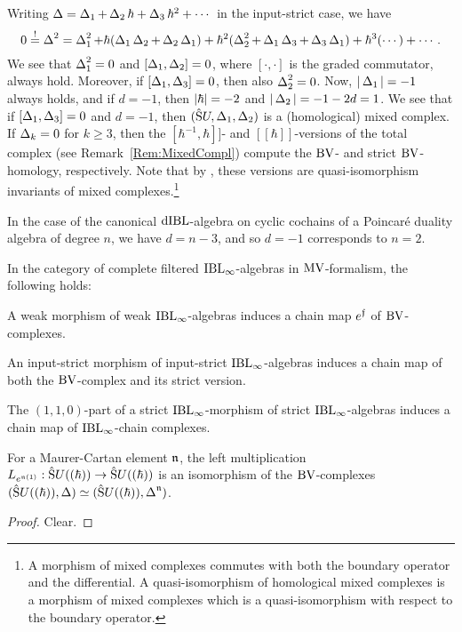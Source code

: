 \documentclass[\MainFolder/Text.tex]{subfiles}
\begin{document}
\begin{Remark}\label{Rem:BVBicomp}
Writing $\operatorname{\Delta} = \operatorname{\Delta}_1 + \operatorname{\Delta}_2 \hbar + \operatorname{\Delta}_3 \hbar^2 + \dotsb$ in the input-strict case, we have 
\[ 0 \overset{!}{=} \operatorname{\Delta}^2 = \operatorname{\Delta}_1^2 + \hbar(\operatorname{\Delta}_1 \operatorname{\Delta}_2 + \operatorname{\Delta}_2 \operatorname{\Delta}_1) + \hbar^2(\operatorname{\Delta}_2^2 + \operatorname{\Delta}_1 \operatorname{\Delta}_3 + \operatorname{\Delta}_3 \operatorname{\Delta}_1) + \hbar^3(\dotsb) + \dotsb. \]
We see that $\operatorname{\Delta}_1^2 = 0$ and $[\operatorname{\Delta}_1,\operatorname{\Delta}_2] = 0$, where $[\cdot,\cdot]$ is the graded commutator, always hold. Moreover, if $[\operatorname{\Delta}_1,\operatorname{\Delta}_3] = 0$, then also $\operatorname{\Delta}_2^2 = 0$. Now, $|\operatorname{\Delta}_1| = -1$ always holds, and if $d=-1$, then $|\hbar| = -2$ and $|\operatorname{\Delta}_2| = -1 - 2d = 1$. We see that if $[\operatorname{\Delta}_1,\operatorname{\Delta}_3]=0$ and $d=-1$, then $(\hat{\mathrm{S}}U, \operatorname{\Delta}_1, \operatorname{\Delta}_2)$ is a (homological) mixed complex. If $\operatorname{\Delta}_k = 0$ for $k \ge 3$, then the $[\hbar^{-1},\hbar]]$- and $[[\hbar]]$-versions of the total complex (see Remark~\ref{Rem:MixedCompl}) compute the $\mathrm{BV}$- and strict $\mathrm{BV}$-homology, respectively. Note that by \cite[Proposition~2.2]{Cieliebak2018b}, these versions are quasi-isomorphism invariants of mixed complexes.\footnote{A morphism of mixed complexes commutes with both the boundary operator and the differential. A quasi-isomorphism of homological mixed complexes is a morphism of mixed complexes which is a quasi-isomorphism with respect to the boundary operator.}

In the case of the canonical $\mathrm{dIBL}$-algebra on cyclic cochains of a Poincar\'e duality algebra of degree $n$, we have $d=n-3$, and so $d=-1$ corresponds to $n=2$.
\end{Remark}
\begin{Proposition}\label{Prop:ObservationsMor}
In the category of complete filtered $\mathrm{IBL}_\infty$-algebras in $\mathrm{MV}$-formalism, the following holds:
\begin{ClaimList}
 \item A weak morphism of weak $\mathrm{IBL}_\infty$-algebras induces a chain map $e^{\mathfrak{f}}$ of $\mathrm{BV}$-complexes.
 \item An input-strict morphism of input-strict $\mathrm{IBL}_\infty$-algebras induces a chain map of both the $\mathrm{BV}$-complex and its strict version. 
 \item The $(1,1,0)$-part of a strict $\mathrm{IBL}_\infty$-morphism of strict $\mathrm{IBL}_\infty$-algebras induces a chain map of $\mathrm{IBL}_\infty$-chain complexes.
 \item For a Maurer-Cartan element $\mathfrak{n}$, the left multiplication $L_{e^{\mathfrak{n}(1)}}: \hat{\mathrm{S}}U((\hbar))\rightarrow \hat{\mathrm{S}}U((\hbar))$ is an isomorphism of the $\mathrm{BV}$-complexes $(\hat{\mathrm{S}}U((\hbar)),\operatorname{\Delta})\simeq (\hat{\mathrm{S}}U((\hbar)),\operatorname{\Delta}^{\mathfrak{n}})$.
\end{ClaimList}
\end{Proposition}
\begin{proof}
Clear.
\end{proof}
\end{document}
